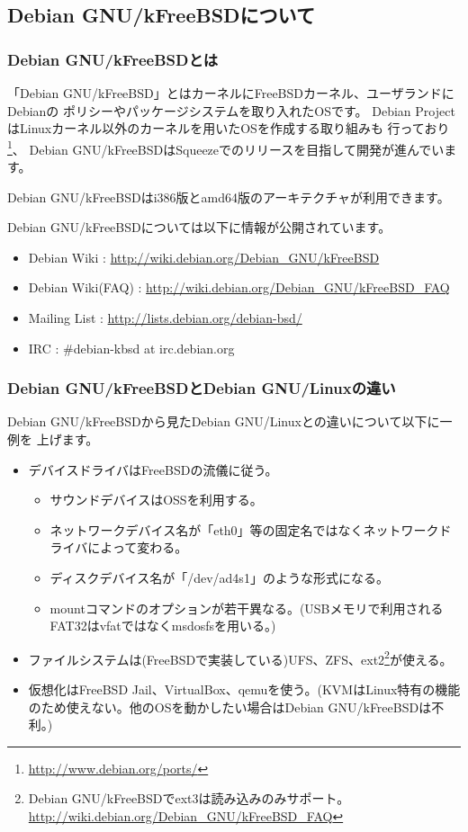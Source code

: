 \documentclass[mingoth,a4paper]{jsarticle}
\begin{document}

\subsection{Debian GNU/kFreeBSDについて}

\subsubsection{Debian GNU/kFreeBSDとは}
「Debian GNU/kFreeBSD」とはカーネルにFreeBSDカーネル、ユーザランドにDebianの
ポリシーやパッケージシステムを取り入れたOSです。
Debian ProjectはLinuxカーネル以外のカーネルを用いたOSを作成する取り組みも
行っており\footnote{\url{http://www.debian.org/ports/}}、
Debian GNU/kFreeBSDはSqueezeでのリリースを目指して開発が進んでいます。


Debian GNU/kFreeBSDはi386版とamd64版のアーキテクチャが利用できます。

Debian GNU/kFreeBSDについては以下に情報が公開されています。

\begin{itemize}
 \item Debian Wiki      : \url{http://wiki.debian.org/Debian\_GNU/kFreeBSD}
 \item Debian Wiki(FAQ) : \url{http://wiki.debian.org/Debian\_GNU/kFreeBSD\_FAQ}
 \item Mailing List     : \url{http://lists.debian.org/debian-bsd/}
 \item IRC              : \#debian-kbsd at irc.debian.org
\end{itemize}

\subsubsection{Debian GNU/kFreeBSDとDebian GNU/Linuxの違い}
Debian GNU/kFreeBSDから見たDebian GNU/Linuxとの違いについて以下に一例を
上げます。

\begin{itemize}
 \item デバイスドライバはFreeBSDの流儀に従う。
 \begin{itemize}
  \item サウンドデバイスはOSSを利用する。
  \item ネットワークデバイス名が「eth0」等の固定名ではなくネットワークドライバによって変わる。
  \item ディスクデバイス名が「/dev/ad4s1」のような形式になる。
  \item mountコマンドのオプションが若干異なる。(USBメモリで利用されるFAT32はvfatではなくmsdosfsを用いる。)
 \end{itemize}
 \item ファイルシステムは(FreeBSDで実装している)UFS、ZFS、ext2\footnote{Debian GNU/kFreeBSDでext3は読み込みのみサポート。\url{http://wiki.debian.org/Debian_GNU/kFreeBSD_FAQ}}が使える。
 \item 仮想化はFreeBSD Jail、VirtualBox、qemuを使う。(KVMはLinux特有の機能のため使えない。他のOSを動かしたい場合はDebian GNU/kFreeBSDは不利。)
\end{itemize}
\end{document}

